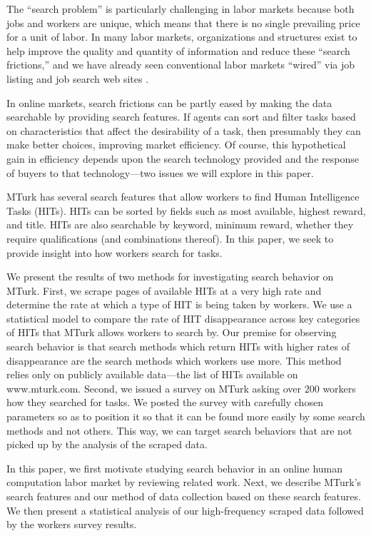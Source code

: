 \documentclass{acm_proc_article-sp}
\begin{document}
The ``search problem'' is particularly challenging in labor markets
because both jobs and workers are unique, which means that there is no
single prevailing price for a unit of labor. In many labor markets,
organizations and structures exist to help improve the quality and
quantity of information and reduce these ``search frictions,'' and we
have already seen conventional labor markets ``wired'' via job listing
and job search web sites \cite{autor2001wiring}.

In online markets, search frictions can be partly eased by making the
data searchable by providing search features.  If agents can sort and
filter tasks based on characteristics that affect the desirability of
a task, then presumably they can make better choices, improving market
efficiency. Of course, this hypothetical gain in efficiency depends
upon the search technology provided and the response of buyers to that
technology---two issues we will explore in this paper.

MTurk has several search features that allow workers to find Human
Intelligence Tasks (HITs).  HITs can be sorted by fields such as most
available, highest reward, and title.  HITs are also searchable by
keyword, minimum reward, whether they require qualifications (and
combinations thereof).  In this paper, we seek to provide insight into
how workers search for tasks.

We present the results of two methods for investigating search
behavior on MTurk.  First, we scrape pages of available HITs at a very
high rate and determine the rate at which a type of HIT is being taken
by workers.  We use a statistical model to compare the rate of HIT
disappearance across key categories of HITs that MTurk allows workers
to search by.  Our premise for observing search behavior is that
search methods which return HITs with higher rates of disappearance
are the search methods which workers use more.  This method relies
only on publicly available data---the list of HITs available on
www.mturk.com.  Second, we issued a survey on MTurk asking over 200
workers how they searched for tasks.  We posted the survey with
carefully chosen parameters so as to position it so that it can be
found more easily by some search methods and not others. This way, we
can target search behaviors that are not picked up by the analysis of
the scraped data.

In this paper, we first motivate studying search behavior in an online
human computation labor market by reviewing related work.  Next, we
describe MTurk's search features and our method of data collection
based on these search features.  We then present a statistical
analysis of our high-frequency scraped data followed by the workers
survey results.
\end{document}
